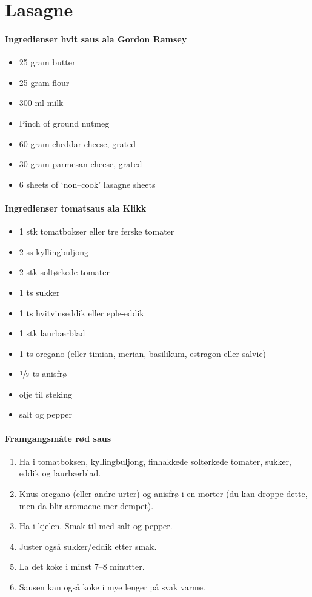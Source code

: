 \section{﻿Lasagne}


\paragraph{Ingredienser hvit saus ala Gordon Ramsey}
\begin{itemize}[noitemsep]
	\item 25 gram butter
	\item 25 gram flour
	\item 300 ml milk
	\item Pinch of ground nutmeg
	\item 60 gram cheddar cheese, grated
	\item 30 gram parmesan cheese, grated
	\item 6 sheets of `non--cook' lasagne sheets
\end{itemize}

\paragraph{Ingredienser tomatsaus ala Klikk}
\begin{itemize}[noitemsep]
	\item 1 stk tomatbokser eller tre ferske tomater
	\item 2 ss kyllingbuljong
	\item 2 stk soltørkede tomater
	\item 1 ts sukker
	\item 1 ts hvitvinseddik eller eple-eddik
	\item 1 stk laurbærblad
	\item 1 ts oregano (eller timian, merian, basilikum, estragon eller salvie)
	\item  $\sfrac{1}{2}$  ts anisfrø
	\item olje til steking
	\item salt og pepper
\end{itemize}

\paragraph{Framgangsmåte rød saus}
\begin{enumerate}[noitemsep]
	\item Ha i tomatboksen, kyllingbuljong, finhakkede soltørkede tomater, sukker, eddik og laurbærblad.
	\item Knus oregano (eller andre urter) og anisfrø i en morter (du kan droppe dette, men da blir aromaene mer dempet).
	\item Ha i kjelen. Smak til med salt og pepper.
	\item Juster også sukker/eddik etter smak.
	\item La det koke i minst 7--8 minutter.
	\item Sausen kan også koke i mye lenger på svak varme.
	\end{enumerate}

